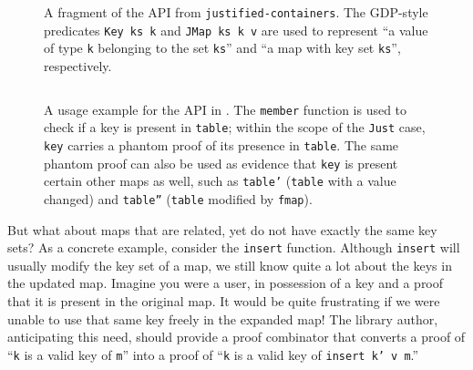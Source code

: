 \documentclass[format=sigplan, review=false, screen=true, 10pt]{acmart}
\makeatletter
\let\origsubsection\subsection
\renewcommand\subsection{\@ifstar{\starsubsection}{\nostarsubsection}}
\newcommand\nostarsubsection[1]
{\subsectionprelude\origsubsection{#1}\subsectionpostlude}
\newcommand\starsubsection[1]
{\subsectionprelude\origsubsection*{#1}\subsectionpostlude}
\newcommand\subsectionprelude{%
  \vspace{-0.25em}
}
\newcommand\subsectionpostlude{%
  \vspace{-0.05em}
}
\makeatother
\begin{document}
\begin{figure}
  \inputminted{haskell}{justified.hs}
  \caption{A fragment of the API from \texttt{justified-containers}.
    The GDP-style predicates \texttt{Key ks k} and \texttt{JMap ks k v} are used to represent
    ``a value of type \texttt{k} belonging to the set \texttt{ks}'' and ``a map with key set \texttt{ks}'',
    respectively. \label{justified-api}}
\end{figure}
\begin{figure}
  \inputminted{haskell}{justified-usage.hs}
  \caption{A usage example for the API in . The \texttt{member} function is used
    to check if a key is present in \texttt{table}; within the scope of the \texttt{Just} case, \texttt{key}
    carries a phantom proof of its presence in \texttt{table}. The same phantom proof can also be used as evidence that
    \texttt{key} is present certain other maps as well, such as \texttt{table'} (\texttt{table} with a
    value changed) and \texttt{table''} (\texttt{table} modified by \texttt{fmap}).\label{justified-usage}} 
\end{figure}


\subsection{Changing the Key Set}\label{changing-keys}
But what about maps that are related, yet do not have exactly the same key sets?
As a concrete example, consider the \texttt{insert} function. Although \texttt{insert} will usually
modify the key set of a map, we still know quite a lot about the keys in the updated map.
 Imagine you were a user, in possession of a key and a proof
that it is present in the original map. It would be quite frustrating if  we were
unable to use that same key freely in the expanded map!
The library author, anticipating this need, should provide a proof combinator that
converts a proof of ``\texttt{k} is a valid key of \texttt{m}'' into a proof of
``\texttt{k} is a valid key of \texttt{insert k' v m}.''
\end{document}
